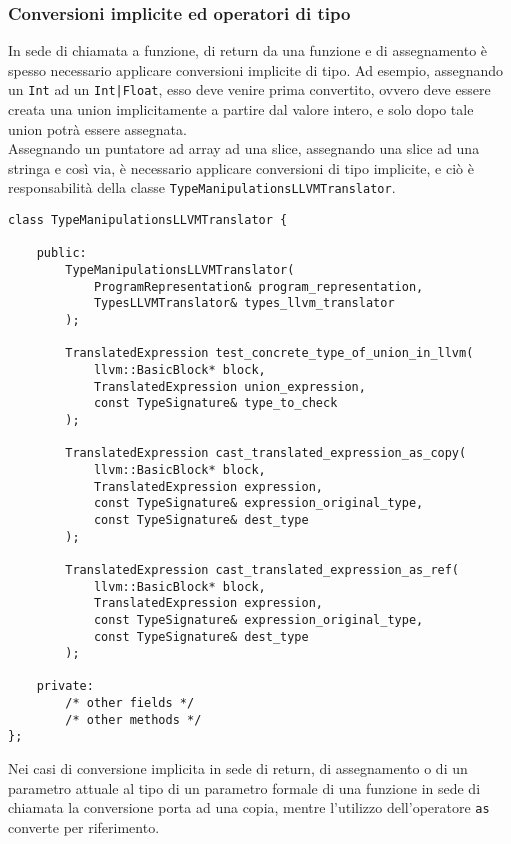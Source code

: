 \subsubsection{Conversioni implicite ed operatori di tipo}
In sede di chiamata a funzione, di return da una funzione e di assegnamento è spesso necessario applicare conversioni 
implicite di tipo. Ad esempio, assegnando un \texttt{Int} ad un \texttt{Int|Float}, esso deve venire prima convertito, 
ovvero deve essere creata una union implicitamente a partire dal valore intero, e solo dopo tale union potrà essere assegnata. \\

Assegnando un puntatore ad array ad una slice, assegnando una slice ad una stringa e così via, è necessario applicare
conversioni di tipo implicite, e ciò è responsabilità della classe \texttt{TypeManipulationsLLVMTranslator}. \\

\vspace{0.5cm}
\begin{lstlisting}[frame=single]
class TypeManipulationsLLVMTranslator {

    public:
        TypeManipulationsLLVMTranslator(
            ProgramRepresentation& program_representation, 
            TypesLLVMTranslator& types_llvm_translator
        );

        TranslatedExpression test_concrete_type_of_union_in_llvm(
            llvm::BasicBlock* block,
            TranslatedExpression union_expression,
            const TypeSignature& type_to_check
        );

        TranslatedExpression cast_translated_expression_as_copy(
            llvm::BasicBlock* block,
            TranslatedExpression expression,
            const TypeSignature& expression_original_type,
            const TypeSignature& dest_type
        );

        TranslatedExpression cast_translated_expression_as_ref(
            llvm::BasicBlock* block,
            TranslatedExpression expression,
            const TypeSignature& expression_original_type,
            const TypeSignature& dest_type
        );

    private:
        /* other fields */
        /* other methods */
};
\end{lstlisting}
\vspace{0.5cm}

\newpage

Nei casi di conversione implicita in sede di return, di assegnamento o di un parametro attuale al tipo di un parametro formale 
di una funzione in sede di chiamata la conversione porta ad una copia, mentre l'utilizzo dell'operatore \texttt{as} converte per riferimento. \\

